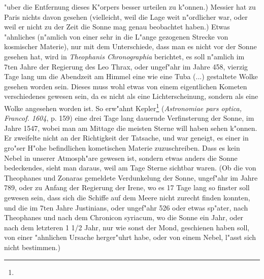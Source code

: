 \documentclass[a4paper, 11pt, oneside, polutonikogreek, german]{article}
\begin{document}
"uber die Entfernung dieses K"orpers besser urteilen zu k"onnen.) Messier hat zu Paris nichts davon gesehen (vielleicht, weil die Lage weit n"ordlicher war, oder weil er nicht zu der Zeit die Sonne mag genau beobachtet haben.) Etwas "ahnliches (n"amlich von einer sehr in die L"ange gezogenen Strecke von kosmischer Materie), nur mit dem Unterschiede, dass man es nicht vor der Sonne gesehen hat, wird in \emph{Theophanis Chronographia} berichtet, es soll n"amlich im 7ten Jahre der Regierung des Leo Thrax, oder ungef"ahr im Jahre 458, vierzig Tage lang um die Abendzeit am Himmel eine wie eine Tuba (...) gestaltete Wolke gesehen worden sein. Dieses muss wohl etwas von einem eigentlichen Kometen verschiedenes gewesen sein, da es nicht als eine Lichterscheinung, sondern als eine Wolke angesehen worden ist. So erw"ahnt Kepler\footnote{} (\emph{Astronomiae pars optica, Francof. 1604}, p. 159) eine drei Tage lang dauernde Verfinsterung der Sonne, im Jahre 1547, wobei man am Mittage die meisten Sterne will haben sehen k"onnen. Er zweifelte nicht an der Richtigkeit der Tatsache, und war geneigt, es einer in gro"ser H"ohe befindlichen kometischen Materie zuzuschreiben. Dass es kein Nebel in unserer Atmosph"are gewesen ist, sondern etwas anders die Sonne bedeckendes, sieht man daraus, weil am Tage Sterne sichtbar waren. (Ob die von Theophanes und Zonaras gemeldete Verdunkelung der Sonne, ungef"ahr im Jahre 789, oder zu Anfang der Regierung der Irene, wo es 17 Tage lang so finster soll gewesen sein, dass sich die Schiffe auf dem Meere nicht zurecht finden konnten, und die im 7ten Jahre Justinians, oder ungef"ahr 526 oder etwas sp"ater, nach Theophanes und nach dem Chronicon syriacum, wo die Sonne ein Jahr, oder nach dem letzteren 1 1/2 Jahr, nur wie sonst der Mond, geschienen haben soll, von einer "ahnlichen Ursache herger"uhrt habe, oder von einem Nebel, l"asst sich nicht bestimmen.) 
\end{document}
